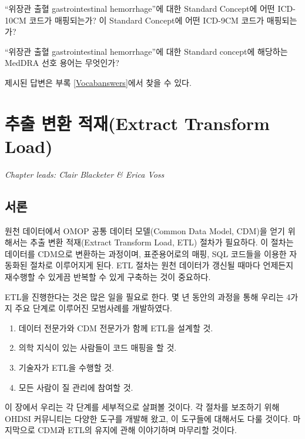 \documentclass[11pt]{book}
\providecommand{\tightlist}{%
  \setlength{\itemsep}{0pt}\setlength{\parskip}{0pt}}
\theoremstyle{definition}
\theoremstyle{definition}
\theoremstyle{definition}
\theoremstyle{remark}
\let\BeginKnitrBlock\begin \let\EndKnitrBlock\end
\begin{document}
\BeginKnitrBlock{exercise}
\protect\hypertarget{exr:exerciseVocab2}{}{\label{exr:exerciseVocab2}
}``위장관 출혈 gastrointestinal hemorrhage''에 대한 Standard Concept에
어떤 ICD-10CM 코드가 매핑되는가? 이 Standard Concept에 어떤 ICD-9CM
코드가 매핑되는가?
\EndKnitrBlock{exercise}

\BeginKnitrBlock{exercise}
\protect\hypertarget{exr:exerciseVocab3}{}{\label{exr:exerciseVocab3}
}``위장관 출혈 gastrointestinal hemorrhage''에 대한 Standard concept에
해당하는 MedDRA 선호 용어는 무엇인가?
\EndKnitrBlock{exercise}

제시된 답변은 부록 \ref{Vocabanswers}에서 찾을 수 있다.

\chapter{추출 변환 적재(Extract Transform
Load)}\label{ExtractTransformLoad}

\emph{Chapter leads: Clair Blacketer \& Erica Voss}

\section{서론}

원천 데이터에서 OMOP 공통 데이터 모델(Common Data Model, CDM)을 얻기
위해서는 추출 변환 적재(Extract Transform Load, ETL) 절차가 필요하다. 이
절차는 데이터를 CDM으로 변환하는 과정이며, 표준용어로의 매핑, SQL
코드들을 이용한 자동화된 절차로 이루어지게 된다. ETL 절차는 원천
데이터가 갱신될 때마다 언제든지 재수행할 수 있게끔 반복할 수 있게
구축하는 것이 중요하다.
 
 

ETL을 진행한다는 것은 많은 일을 필요로 한다. 몇 년 동안의 과정을 통해
우리는 4가지 주요 단계로 이루어진 모범사례를 개발하였다.

\begin{enumerate}
\def\labelenumi{\arabic{enumi}.}
\tightlist
\item
  데이터 전문가와 CDM 전문가가 함께 ETL을 설계할 것.
\item
  의학 지식이 있는 사람들이 코드 매핑을 할 것.
\item
  기술자가 ETL을 수행할 것.
\item
  모든 사람이 질 관리에 참여할 것.
\end{enumerate}

이 장에서 우리는 각 단계를 세부적으로 살펴볼 것이다. 각 절차를 보조하기
위해 OHDSI 커뮤니티는 다양한 도구를 개발해 왔고, 이 도구들에 대해서도
다룰 것이다. 마지막으로 CDM과 ETL의 유지에 관해 이야기하며 마무리할
것이다.
\end{document}
